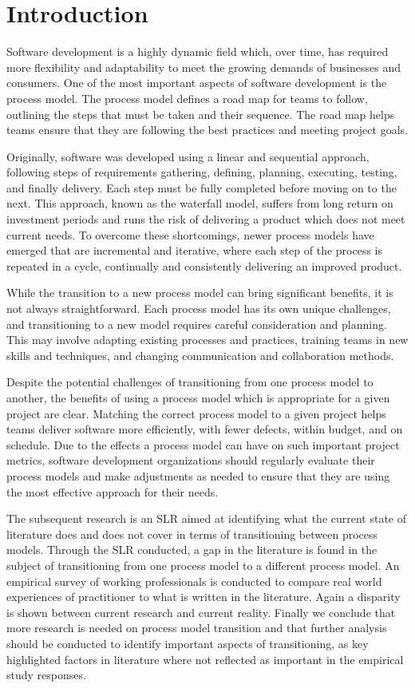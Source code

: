 \documentclass[conference]{IEEEtran}
\begin{document}
\section{Introduction}
Software development is a highly dynamic field which, over time, has required more flexibility and adaptability to meet the growing demands of businesses and consumers\cite{9753613}. One of the most important aspects of software development is the process model. The process model defines a road map for teams to follow, outlining the steps that must be taken and their sequence. The road map helps teams ensure that they are following the best practices and meeting project goals.

Originally, software was developed using a linear and sequential approach, following steps of requirements gathering, defining, planning, executing, testing, and finally delivery\cite{8672701}. Each step must be fully completed before moving on to the next. This approach, known as the waterfall model, suffers from long return on investment periods and runs the risk of delivering a product which does not meet current needs. To overcome these shortcomings, newer process models have emerged that are incremental and iterative, where each step of the process is repeated in a cycle, continually and consistently delivering an improved product.

While the transition to a new process model can bring significant benefits, it is not always straightforward\cite{6702805}. Each process model has its own unique challenges, and transitioning to a new model requires careful consideration and planning. This may involve adapting existing processes and practices, training teams in new skills and techniques, and changing communication and collaboration methods.

Despite the potential challenges of transitioning from one process model to another, the benefits of using a process model which is appropriate for a given project are clear. Matching the correct process model to a given project helps teams deliver software more efficiently, with fewer defects, within budget, and on schedule. Due to the effects a process model can have on such important project metrics, software development organizations should regularly evaluate their process models and make adjustments as needed to ensure that they are using the most effective approach for their needs\cite{10049356}.

The subsequent research is an SLR aimed at identifying what the current state of literature does and does not cover in terms of transitioning between process models. Through the SLR conducted, a gap in the literature is found in the subject of transitioning from one process model to a different process model. An empirical survey of working professionals is conducted to compare real world experiences of practitioner to what is written in the literature. Again a disparity is shown between current research and current reality. Finally we conclude that more research is needed on process model transition and that further analysis should be conducted to identify important aspects of transitioning, as key highlighted factors in literature where not reflected as important in the empirical study responses.
\end{document}
